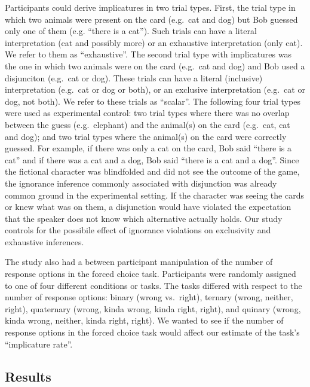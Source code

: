 \documentclass[floatsintext,man]{apa6}
\theoremstyle{definition}
\theoremstyle{definition}
\theoremstyle{definition}
\theoremstyle{remark}
\begin{document}
Participants could derive implicatures in two trial types. First, the
trial type in which two animals were present on the card (e.g.~cat and
dog) but Bob guessed only one of them (e.g. \enquote{there is a cat}).
Such trials can have a literal interpretation (cat and possibly more) or
an exhaustive interpretation (only cat). We refer to them as
\enquote{exhaustive}. The second trial type with implicatures was the
one in which two animals were on the card (e.g.~cat and dog) and Bob
used a disjunciton (e.g.~cat or dog). These trials can have a literal
(inclusive) interpretation (e.g.~cat or dog or both), or an exclusive
interpretation (e.g.~cat or dog, not both). We refer to these trials as
\enquote{scalar}. The following four trial types were used as
experimental control: two trial types where there was no overlap between
the guess (e.g.~elephant) and the animal(s) on the card (e.g.~cat, cat
and dog); and two trial types where the animal(s) on the card were
correctly guessed. For example, if there was only a cat on the card, Bob
said \enquote{there is a cat} and if there was a cat and a dog, Bob said
\enquote{there is a cat and a dog}. Since the fictional character was
blindfolded and did not see the outcome of the game, the ignorance
inference commonly associated with disjunction was already common ground
in the experimental setting. If the character was seeing the cards or
knew what was on them, a disjunction would have violated the expectation
that the speaker does not know which alternative actually holds. Our
study controls for the possibile effect of ignorance violations on
exclusivity and exhaustive inferences.

The study also had a between participant manipulation of the number of
response options in the forced choice task. Participants were randomly
assigned to one of four different conditions or tasks. The tasks
differed with respect to the number of response options: binary (wrong
vs.~right), ternary (wrong, neither, right), quaternary (wrong, kinda
wrong, kinda right, right), and quinary (wrong, kinda wrong, neither,
kinda right, right). We wanted to see if the number of response options
in the forced choice task would affect our estimate of the task's
\enquote{implicature rate}.

\subsection{Results}\label{results}
\end{document}

